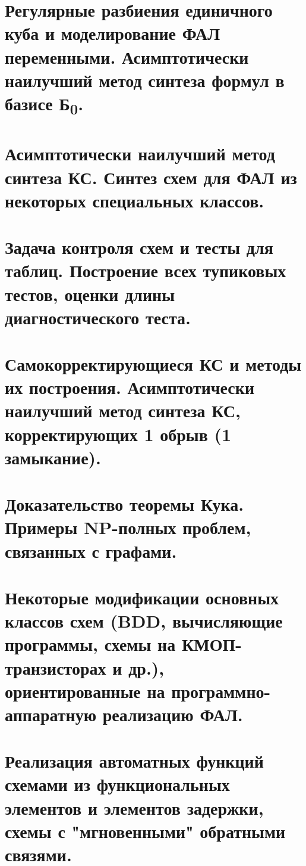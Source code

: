 \documentclass[11pt]{article}
\begin{document}
\section{Регулярные разбиения единичного куба и моделирование ФАЛ переменными. Асимптотически наилучший метод синтеза формул в базисе Б\textsubscript{0}.}
\label{sec:orgfe25d3f}
\section{Асимптотически наилучший метод синтеза КС. Синтез схем для ФАЛ из некоторых специальных классов.}
\label{sec:org766e04a}
\section{Задача контроля схем и тесты для таблиц. Построение всех тупиковых тестов, оценки длины диагностического теста.}
\label{sec:org97222b1}
\section{Самокорректирующиеся КС и методы их построения. Асимптотически наилучший метод синтеза КС, корректирующих 1 обрыв (1 замыкание).}
\label{sec:orge35abf9}
\section{Доказательство теоремы Кука. Примеры NP-полных проблем, связанных с графами.}
\label{sec:org75d2ee6}
\section{Некоторые модификации основных классов схем (BDD, вычисляющие программы, схемы на КМОП-транзисторах и др.), ориентированные на программно-аппаратную реализацию ФАЛ.}
\label{sec:orge790954}
\section{Реализация автоматных функций схемами из функциональных элементов и элементов задержки, схемы с "мгновенными" обратными связями.}
\label{sec:org6f43e42}
\end{document}
